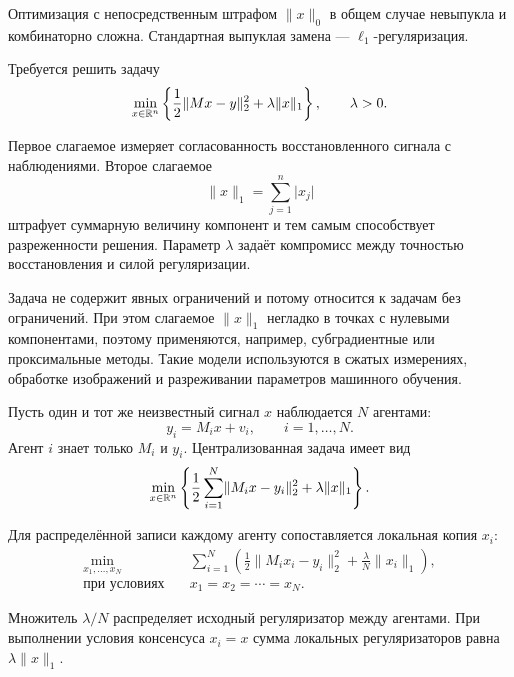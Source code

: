 Оптимизация с непосредственным штрафом \(\lVert x\rVert_0\) в общем
случае невыпукла и комбинаторно сложна. Стандартная выпуклая замена ---
\(\ell_1\)-регуляризация.

\begin{problem}
Требуется решить задачу
\[
    \min_{x\in\mathbb{R}^n}
    \left\{
        \frac12\lVert Mx-y\rVert_2^2
        +
        \lambda\lVert x\rVert_1
    \right\},
    \qquad
    \lambda>0.
\]
\end{problem}

Первое слагаемое измеряет согласованность восстановленного сигнала с
наблюдениями. Второе слагаемое
\[
    \lVert x\rVert_1
    =
    \sum_{j=1}^{n}\lvert x_j\rvert
\]
штрафует суммарную величину компонент и тем самым способствует
разреженности решения. Параметр \(\lambda\) задаёт компромисс между
точностью восстановления и силой регуляризации.

Задача не содержит явных ограничений и потому относится к задачам
без ограничений. При этом слагаемое \(\lVert x\rVert_1\) негладко в
точках с нулевыми компонентами, поэтому применяются, например,
субградиентные или проксимальные методы. Такие модели используются в
сжатых измерениях, обработке изображений и разреживании параметров
машинного обучения.



Пусть один и тот же неизвестный сигнал \(x\) наблюдается \(N\)
агентами:
\[
    y_i=M_ix+v_i,
    \qquad
    i=1,\ldots,N.
\]
Агент \(i\) знает только \(M_i\) и \(y_i\). Централизованная задача
имеет вид
\[
    \min_{x\in\mathbb{R}^n}
    \left\{
        \frac12
        \sum_{i=1}^{N}
        \lVert M_ix-y_i\rVert_2^2
        +
        \lambda\lVert x\rVert_1
    \right\}.
\]

Для распределённой записи каждому агенту сопоставляется локальная
копия \(x_i\):
\[
    \begin{aligned}
        \min_{x_1,\ldots,x_N}
        \quad&
        \sum_{i=1}^{N}
        \left(
            \frac12\lVert M_ix_i-y_i\rVert_2^2
            +
            \frac{\lambda}{N}\lVert x_i\rVert_1
        \right),
        \\
        \text{при условиях}
        \quad&
        x_1=x_2=\cdots=x_N.
    \end{aligned}
\]

\begin{remark}
Множитель \(\lambda/N\) распределяет исходный регуляризатор между
агентами. При выполнении условия консенсуса \(x_i=x\) сумма локальных
регуляризаторов равна \(\lambda\lVert x\rVert_1\).
\end{remark}


